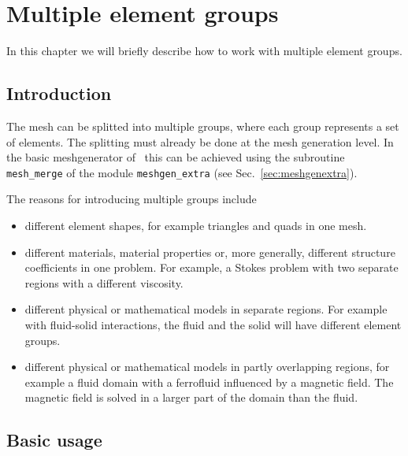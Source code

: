 
\chapter{Multiple element groups}

\def\chaptertitle{Multiple element groups}
\def\headdate{23rd September 2010}

In this chapter we will briefly describe how to work with multiple element
groups.

\section{Introduction}

The mesh can be splitted into multiple groups, where each group represents a set
of elements. The splitting must already be done at the mesh generation level.
In the basic meshgenerator of \tfem\ this can be achieved using the subroutine
\texttt{mesh\_merge} of the module \texttt{meshgen\_extra}
(see Sec.~\ref{sec:meshgenextra}).

The reasons for introducing multiple groups include
\begin{itemize}
   \item different element shapes, for example triangles and quads in one mesh. 
   \item different materials, material properties or, more generally,
         different structure coefficients in one problem. For example, a Stokes
         problem with two separate regions with a different viscosity.
   \item different physical or mathematical models in separate regions.
         For example with fluid-solid interactions, the fluid and the
         solid will have different element groups.
   \item different physical or mathematical models in partly overlapping
         regions, for example a fluid domain with a ferrofluid influenced by a
         magnetic field. The magnetic field is solved in a larger part of the
         domain than the fluid.
\end{itemize}

\section{Basic usage}

